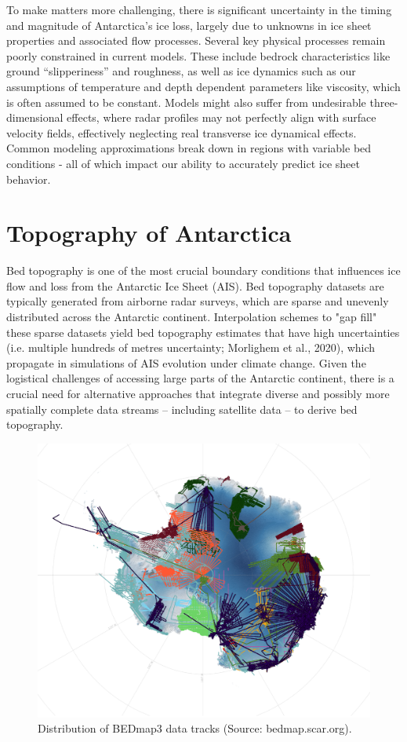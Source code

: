 To make matters more challenging, there is significant uncertainty in the timing and magnitude of Antarctica's ice loss, largely due to unknowns in ice sheet properties and associated flow processes\cite{IPCC}. Several key physical processes remain poorly constrained in current models. These include bedrock characteristics like ground ``slipperiness'' and roughness, as well as ice dynamics such as our assumptions of temperature and depth dependent parameters like viscosity, which is often assumed to be constant. Models might also suffer from undesirable three-dimensional effects, where radar profiles may not perfectly align with surface velocity fields, effectively neglecting real transverse ice dynamical effects. Common modeling approximations break down in regions with variable bed conditions - all of which impact our ability to accurately predict ice sheet behavior\cite{Ockenden_2022}.

\chapter*{Topography of Antarctica}\label{review}

Bed topography is one of the most crucial boundary conditions that influences ice flow and loss from the Antarctic Ice Sheet (AIS)\cite{Morlighem_2020}. Bed topography datasets are typically generated from airborne radar surveys, which are sparse and unevenly distributed across the Antarctic continent. Interpolation schemes to "gap fill" these sparse datasets yield bed topography estimates that have high uncertainties (i.e. multiple hundreds of metres uncertainty; Morlighem et al., 2020), which propagate in simulations of AIS evolution under climate change\cite{Castleman_2022}. Given the logistical challenges of accessing large parts of the Antarctic continent, there is a crucial need for alternative approaches that integrate diverse and possibly more spatially complete data streams – including satellite data – to derive bed topography.
\begin{figure}[H]    %
    \includegraphics[scale=0.4]{BEDmap3.png}
    \caption{Distribution of BEDmap3 data tracks (Source: bedmap.scar.org).}
\end{figure}

